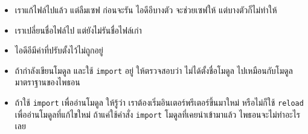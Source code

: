 \begin{itemize}


\item เราแก้ไฟล์ไปแล้ว แต่ลืมเซฟ ก่อนจะรัน
ไอดีอีบางตัว จะช่วยเซฟให้ แต่บางตัวก็ไม่ทำให้


\item เราเปลี่ยนชื่อไฟล์ไป แต่ยังไม่รันชื่อไฟล์เก่า


\item ไอดีอีมีค่าที่ปรับตั้งไว้ไม่ถูกอยู่


\item ถ้ากำลังเขียนโมดูล และใช้ \texttt{import} อยู่ ให้ตรวจสอบว่า ไม่ได้ตั้งชื่อโมดูล ไปเหมือนกับโมดูลมาตราฐานของไพธอน


\item ถ้าใช้ \texttt{import} เพื่ออ่านโมดูล
ให้รู้ว่า เราต้องเริ่มอินเตอร์พรีเตอร์ขึ้นมาใหม่ หรือไม่ก็ใช้ \texttt{reload} เพื่ออ่านโมดูลที่แก้ไขใหม่
ถ้าแค่ใช้คำสั่ง \texttt{import} โมดูลที่เคยนำเข้ามาแล้ว ไพธอนจะไม่ทำอะไรเลย

\end{itemize}



